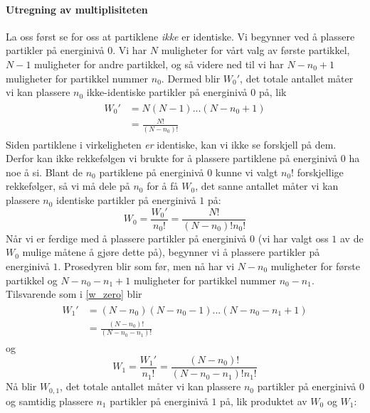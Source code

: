 \paragraph{Utregning av multiplisiteten} La oss først se for oss at partiklene \emph{ikke} er identiske. Vi begynner ved å plassere partikler på energinivå $0$. Vi har $N$ muligheter for vårt valg av første partikkel, $N-1$ muligheter for andre partikkel, og så videre ned til vi har $N-n_0+1$ muligheter for partikkel nummer $n_0$. Dermed blir $W_0'$, det totale antallet måter vi kan plassere $n_0$ ikke-identiske partikler på energinivå $0$ på, lik
\begin{align}
\begin{split}
	\label{w_zero}
	W_0' &= N(N-1)...(N-n_0+1) \\ &= \frac{N!}{(N-n_0)!}
\end{split}
\end{align}
Siden partiklene i virkeligheten \emph{er} identiske, kan vi ikke se forskjell på dem. Derfor kan ikke rekkefølgen vi brukte for å plassere partiklene på energinivå $0$ ha noe å si. Blant de $n_0$ partiklene på energinivå $0$ kunne vi valgt $n_0!$ forskjellige rekkefølger, så vi må dele på $n_0$ for å få $W_0$, det sanne antallet måter vi kan plassere $n_0$ identiske partikler på energinivå $1$ på:
\begin{equation}
	\label{w_zero_true}
	W_0 = \frac{W_0'}{n_0!} = \frac{N!}{(N-n_0)!n_0!}
\end{equation}
Når vi er ferdige med å plassere partikler på energinivå $0$ (vi har valgt oss $1$ av de $W_0$ mulige måtene å gjøre dette på), begynner vi å plassere partikler på energinivå $1$. Prosedyren blir som før, men nå har vi $N-n_0$ muligheter for første partikkel og $N-n_0-n_1+1$ muligheter for partikkel nummer $n_0-n_1$. Tilsvarende som i \eqref{w_zero} blir
\begin{align}
\begin{split}
	\label{w_one}
	W_1' &= (N-n_0)(N-n_0-1)...(N-n_0-n_1+1) \\ 
	&= \frac{(N-n_0)!}{(N-n_0-n_1)!}
\end{split}
\end{align}
og 
\begin{equation}
	\label{w_one_true}
	W_1 = \frac{W_1'}{n_1!} = \frac{(N-n_0)!}{(N-n_0-n_1)!n_1!}
\end{equation}
Nå blir $W_{0,1}$, det totale antallet måter vi kan plassere $n_0$ partikler på energinivå $0$ og samtidig plassere $n_1$ partikler på energinivå $1$ på, lik produktet av $W_0$ og $W_1$:

